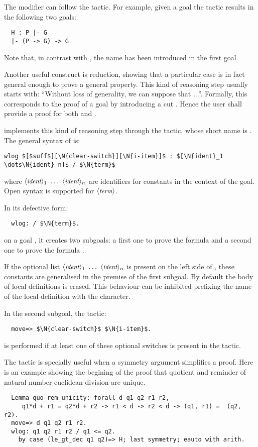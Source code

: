 The  modifier can follow the  tactic.
For example, given a goal  the tactic
 results in the following two goals:
\begin{lstlisting}
  H : P |- G
  |- (P -> G) -> G
\end{lstlisting}
Note that, in contrast with , the name  has been introduced
in the first goal.

Another useful construct is reduction,
showing that a particular case is in fact general enough to prove
a general property. This kind of reasoning step usually starts with:
``Without loss of generality, we can suppose that ...''.
Formally, this corresponds to the proof of a goal  by introducing
a cut . Hence the user shall provide a
proof for both  and
.

\ssr{} implements this kind of reasoning step through the 
tactic, whose short name is . 
The general syntax of  is:
\begin{lstlisting}
wlog $[$suff$][\N{clear-switch}][\N{i-item}]$ : $[\N{ident}_1 \dots\N{ident}_n]$ / $\N{term}$
\end{lstlisting}
where $\N{ident}_1\ \dots\ \N{ident}_n$ are identifiers for constants
in the context of the goal. Open syntax is supported for $\langle\mbox{\itshape\rmfamily\small term}\rangle$.

In its defective form:
\begin{lstlisting}
  wlog: / $\N{term}$.
\end{lstlisting}
on a goal , it creates two subgoals: a first one to prove the formula
 and a second one to prove the formula
.

If the optional list $\N{ident}_1\ \dots\ \N{ident}_n$ is present on the left
side of \C{/}, these constants are generalised in the premise
 of the first subgoal. By default the body of
local definitions  is erased. This behaviour can be inhibited
prefixing the name of the local definition with the  character.

In the second subgoal, the tactic:
\begin{lstlisting}
  move=> $\N{clear-switch}$ $\N{i-item}$.
\end{lstlisting}
is performed if at least one of these optional switches is present in
the  tactic.

The  tactic is specially useful when a symmetry argument
simplifies a proof. Here is an example showing the begining of the
proof that quotient and reminder of natural number euclidean division
are unique.
\begin{lstlisting}
  Lemma quo_rem_unicity: forall d q1 q2 r1 r2, 
     q1*d + r1 = q2*d + r2 -> r1 < d -> r2 < d -> (q1, r1) =  (q2, r2).
  move=> d q1 q2 r1 r2.
  wlog: q1 q2 r1 r2 / q1 <= q2.
    by case (le_gt_dec q1 q2)=> H; last symmetry; eauto with arith.
\end{lstlisting}

